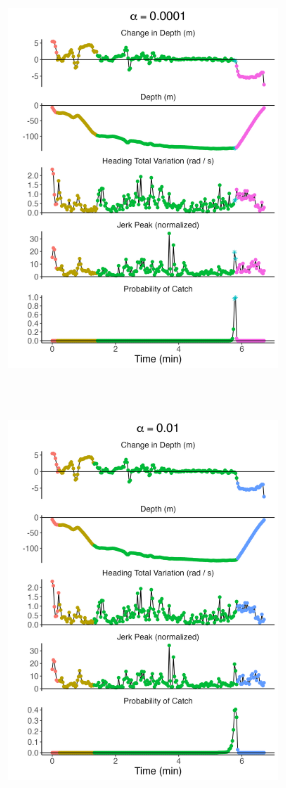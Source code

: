 \begin{figure}
    \centering
    \begin{subfigure}[t]{0.45\textwidth}
        \centering
        \includegraphics[height = 3.75in]{plt/profile_delt_d_htv_jp_normed_-4_4_neg_5489.png}
    \end{subfigure}
    ~
    \begin{subfigure}[t]{0.45\textwidth}
        \centering
        \includegraphics[height = 3.75in]{plt/profile_delt_d_htv_jp_normed_-2_4_neg_5489.png}
    \end{subfigure}
    \\

\end{figure}
